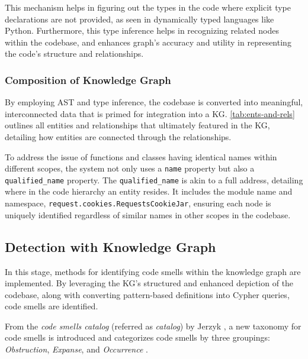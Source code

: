 This mechanism helps in figuring out the types in the code where explicit type declarations are not provided, as seen in dynamically typed languages like Python. Furthermore, this type inference helps in recognizing related nodes within the codebase, and enhances graph's accuracy and utility in representing the code's structure and relationships.






\subsubsection{Composition of Knowledge Graph}
By employing AST and type inference, the codebase is converted into meaningful, interconnected data that is primed for integration into a KG. \autoref{tab:ents-and-rels} outlines all entities and relationships that ultimately featured in the KG, detailing how entities are connected through the relationships.

To address the issue of functions and classes having identical names within different scopes, the system not only uses a \texttt{name} property but also a \texttt{qualified\_name} property. The \texttt{qualified\_name} is akin to a full address, detailing where in the code hierarchy an entity resides. It includes the module name and namespace, \eg \texttt{request.cookies.RequestsCookieJar}, ensuring each node is uniquely identified regardless of similar names in other scopes in the codebase. 





\subsection{Detection with Knowledge Graph}
In this stage, methods for identifying code smells within the knowledge graph are implemented. By leveraging the KG's structured and enhanced depiction of the codebase, along with converting pattern-based definitions into Cypher queries, code smells are identified.


From the \textit{code smells catalog} (referred as \textit{catalog}) by Jerzyk \etal, a new taxonomy for code smells is introduced and categorizes code smells by three groupings: \textit{Obstruction}, \textit{Expanse}, and \textit{Occurrence} \cite{Jerzyk_2023}. 

